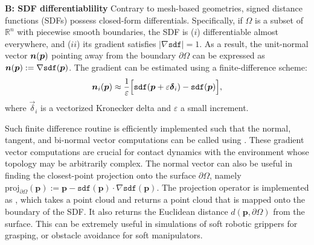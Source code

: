 \textbf{B: SDF differentiablility}
Contrary to mesh-based geometries, signed distance functions (SDFs) possess closed-form differentials. Specifically, if $\Omega$ is a subset of $\mathbb{R}^n$ with piecewise smooth boundaries, the SDF is ($i$) differentiable almost everywhere, and ($ii$) its gradient satisfies $|\nabla \texttt{sdf}| = 1$. As a result, the unit-normal vector ${\boldsymbol{n}}({\boldsymbol{p}})$ pointing away from the boundary $\partial \Omega$ can be expressed as ${\boldsymbol{n}}({\boldsymbol{p}}):= \nabla \texttt{sdf}({\boldsymbol{p}})$. The gradient can be estimated using a finite-difference scheme:
%
\begin{align}
    {\boldsymbol{n}}_{i}({\boldsymbol{p}}) \approx \frac{1}{\varepsilon} \Big[\texttt{sdf}({\boldsymbol{p}} + \varepsilon \boldsymbol{\delta}_{i}) - \texttt{sdf}({\boldsymbol{p}}) \Big],
\end{align}
%
where $\vec{\delta}_{i}$ is a vectorized Kronecker delta and $\varepsilon$ a small increment. 

Such finite difference routine is efficiently implemented such that the normal, tangent, and bi-normal vector computations can be called using . These gradient vector computations are crucial for contact dynamics with the environment whose topology may be arbitrarily complex. The normal vector can also be useful in finding the closest-point projection onto the surface $\partial \Omega$, namely $\textrm{proj}_{\partial \Omega}(\mathbf{p}):= \mathbf{p} - \texttt{sdf}(\mathbf{p}) \cdot \nabla \texttt{sdf}(\mathbf{p})$. The projection operator is implemented as , which takes a point cloud  and returns a point cloud  that is mapped onto the boundary of the SDF. It also returns the Euclidean distance $d(\mathbf{p},\partial \Omega)$ from the surface. This can be extremely useful in simulations of soft robotic grippers for grasping, or obstacle avoidance for soft manipulators.